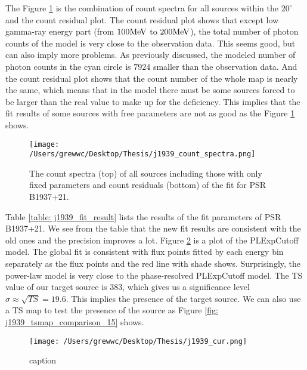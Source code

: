 \documentclass[12pt]{report}
\begin{document}
          The Figure \ref{fig: j1939_count_spectra} is the combination of count spectra for 
          all sources within the $20^{\circ}$ and the count residual plot. The count residual 
          plot shows that except low gamma-ray energy part (from $100\hbox{MeV}$ to 
          $200\hbox{MeV}$), the total number of photon counts of the model is very close to 
          the observation data. This seems good, but can also imply more problems. 
          As previously discussed, the modeled number of photon counts in the cyan circle 
          is $7924$ smaller than the observation data. And the count residual plot shows that 
          the count number of the whole map is nearly the same, which means that in the model
          there must be some sources forced to be larger than the real value to make up for 
          the deficiency. This implies that the fit results of some sources with free 
          parameters are not as good as the Figure \ref{fig: j1939_count_spectra} shows. 
          
          \begin{figure}[!ht]
            \centering
            \texttt{[image: /Users/grewwc/Desktop/Thesis/j1939\_count\_spectra.png]}
            \caption{The count spectra (top) of all sources including those with only fixed 
              parameters and count residuals (bottom) of the fit for PSR B1937+21.}
            \label{fig: j1939_count_spectra}
          \end{figure}

          Table \ref{table: j1939_fit_result} lists the results of the fit parameters of 
          PSR B1937+21. We see from the table that the new fit results are 
          consistent with the old ones and the precision improves a lot. 
          Figure \ref{fig: j1939_pl_and_cutoff} is a plot of the PLExpCutoff model.
          The global fit is consistent with flux points fitted by each energy bin separately 
          as the flux points and the red line with shade shows. Surprisingly, the power-law model
          is very close to the phase-resolved PLExpCutoff model. 
          The TS value of our target source is $383$, which gives us 
          a significance level $\sigma \approx \sqrt{TS} = 19.6$. This implies the presence 
          of the target source. We can also use a TS map to test the presence of the source 
          as Figure \ref{fig: j1939_tsmap_comparison_15} shows. 
          
          \begin{figure}[!ht]
            \centering 
            \texttt{[image: /Users/grewwc/Desktop/Thesis/j1939\_cur.png]}
            \caption{caption}
            \label{fig: j1939_pl_and_cutoff}
          \end{figure}
          
\end{document}
